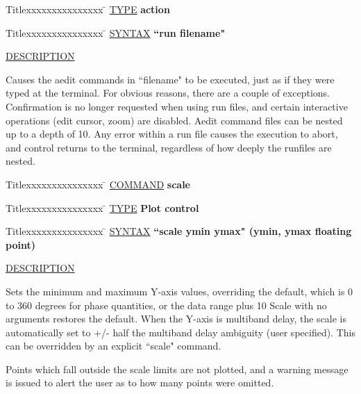 \begin{tabbing}
Titlexxxxxxxxxxxxxxx \= \kill
\underline{TYPE} \> {\bf 		action} \\
\end{tabbing}

\begin{tabbing}
Titlexxxxxxxxxxxxxxx \= \kill
\underline{SYNTAX} \> {\bf 		``run filename"} \\
\end{tabbing}

\underline{DESCRIPTION}
\begin{list}{}{\setlength{\leftmargin}{0.5in}
     \setlength{\rightmargin}{0in}}
\item
Causes the aedit commands in ``filename" to be executed, just
as if they were typed at the terminal.  For obvious reasons,
there are a couple of exceptions.  Confirmation is no longer
requested when using run files, and certain interactive
operations (edit cursor, zoom) are disabled.  Aedit command
files can be nested up to a depth of 10.  Any error within
a run file causes the execution to abort, and control returns
to the terminal, regardless of how deeply the runfiles are
nested.
\end{list}
\vspace{.2in}

\begin{tabbing}
Titlexxxxxxxxxxxxxxx \= \kill
\underline{COMMAND} \> {\bf 	scale} \\
\end{tabbing}

\begin{tabbing}
Titlexxxxxxxxxxxxxxx \= \kill
\underline{TYPE} \> {\bf 		Plot control} \\
\end{tabbing}

\begin{tabbing}
Titlexxxxxxxxxxxxxxx \= \kill
\underline{SYNTAX} \> {\bf 		``scale ymin ymax" (ymin, ymax floating point)} \\
\end{tabbing}

\underline{DESCRIPTION}
\begin{list}{}{\setlength{\leftmargin}{0.5in}
     \setlength{\rightmargin}{0in}}
\item
Sets the minimum and maximum Y-axis values, overriding the
default, which is 0 to 360 degrees for phase quantities, or
the data range plus 10%
Scale with no arguments restores the default.  When
the Y-axis is multiband delay, the scale is automatically set
to +/- half the multiband delay ambiguity (user specified).
This can be overridden by an explicit ``scale" command.
\item
Points which fall outside the scale limits are not plotted, and
a warning message is issued to alert the user as to how many
points were omitted.
\end{list}
\vspace{.2in}

